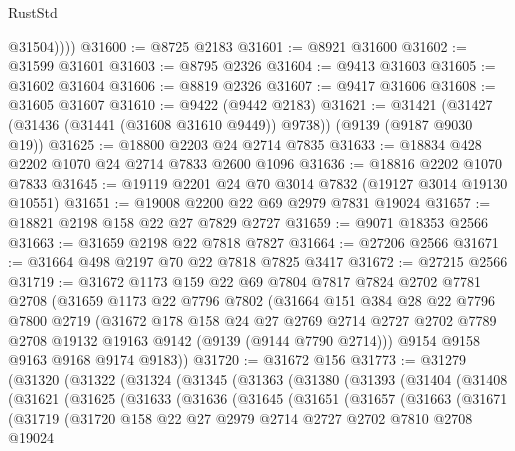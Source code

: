 \begin{lexlean}{RustStd}
\begin{coremodule}
            @31504))))
@31600 := @8725 @2183
@31601 := @8921 @31600
@31602 := @31599 @31601
@31603 := @8795 @2326
@31604 := @9413 @31603
@31605 := @31602 @31604
@31606 := @8819 @2326
@31607 := @9417 @31606
@31608 := @31605 @31607
@31610 := @9422 (@9442 @2183)
@31621 := @31421 (@31427 (@31436 (@31441 (@31608 @31610 @9449)) @9738)) (@9139 (@9187 @9030 @19))
@31625 := @18800 @2203 @24 @2714 @7835
@31633 := @18834 @428 @2202 @1070 @24 @2714 @7833 @2600 @1096
@31636 := @18816 @2202 @1070 @7833
@31645 := @19119 @2201 @24 @70 @3014 @7832 (@19127 @3014 @19130 @10551)
@31651 := @19008 @2200 @22 @69 @2979 @7831 @19024
@31657 := @18821 @2198 @158 @22 @27 @7829 @2727
@31659 := @9071 @18353 @2566
@31663 := @31659 @2198 @22 @7818 @7827
@31664 := @27206 @2566
@31671 := @31664 @498 @2197 @70 @22 @7818 @7825 @3417
@31672 := @27215 @2566
@31719 := @31672
    @1173
    @159
    @22
    @69
    @7804
    @7817
    @7824
    @2702
    @7781
    @2708
    (@31659
      @1173
      @22
      @7796
      @7802
      (@31664
        @151
        @384
        @28
        @22
        @7796
        @7800
        @2719
        (@31672
          @178
          @158
          @24
          @27
          @2769
          @2714
          @2727
          @2702
          @7789
          @2708
          @19132
          @19163
          @9142
          (@9139 (@9144 @7790 @2714)))
        @9154
        @9158
        @9163
        @9168
        @9174
        @9183))
@31720 := @31672 @156
@31773 := @31279
    (@31320
      (@31322
        (@31324
          (@31345
            (@31363
              (@31380
                (@31393
                  (@31404
                    (@31408
                      (@31621
                        (@31625
                          (@31633
                            (@31636
                              (@31645
                                (@31651
                                  (@31657
                                    (@31663
                                      (@31671
                                        (@31719
                                          (@31720
                                            @158
                                            @22
                                            @27
                                            @2979
                                            @2714
                                            @2727
                                            @2702
                                            @7810
                                            @2708
                                            @19024

\end{coremodule}
\end{lexlean}
